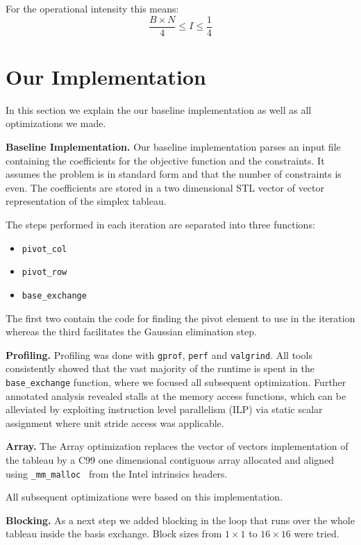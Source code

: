 \documentclass[letterpaper]{article}
\newcommand{\mypar}[1]{{\bf #1.}}
\begin{document}
For the operational intensity this means:
\[ \frac{B\times N}{4} \leq I \leq \frac{1}{4} \]


\section{Our Implementation}\label{sec:yourmethod}

In this section we explain the our baseline implementation as well as all optimizations we made.

\mypar{Baseline Implementation}
Our baseline implementation parses an input file containing the coefficients for the objective function and the constraints.
It assumes the problem is in standard form and that the number of constraints is even.
The coefficients are stored in a two dimensional STL vector of vector representation of the simplex tableau.

The steps performed in each iteration are separated into three functions: 
\begin{itemize}
    \item{\tt pivot\_col}
    \item{\tt pivot\_row}
    \item{\tt base\_exchange}
\end{itemize}
The first two contain the code for finding the pivot element to use in the iteration whereas
the third facilitates the Gaussian elimination step.

\mypar{Profiling}
Profiling was done with {\tt gprof}, {\tt perf} and {\tt valgrind}. All tools consistently showed that the vast majority of the
runtime is spent in the {\tt base\_exchange} function, where we focused all subsequent optimization.
Further annotated analysis revealed stalls at the memory access functions, which can be alleviated by exploiting instruction level parallelism (ILP) via static scalar assignment
where unit stride access was applicable.


\mypar{Array}
The Array optimization replaces the vector of vectors implementation of the tableau by
a C99 one dimensional contiguous array allocated and aligned using {\tt \_mm\_malloc } from
the Intel intrinsics headers.

All subsequent optimizations were based on this implementation.

\mypar{Blocking}
As a next step we added blocking in the loop that runs over the whole tableau 
inside the basis exchange. Block sizes from $1 \times 1$ to $16 \times 16$ were tried.
\end{document}
